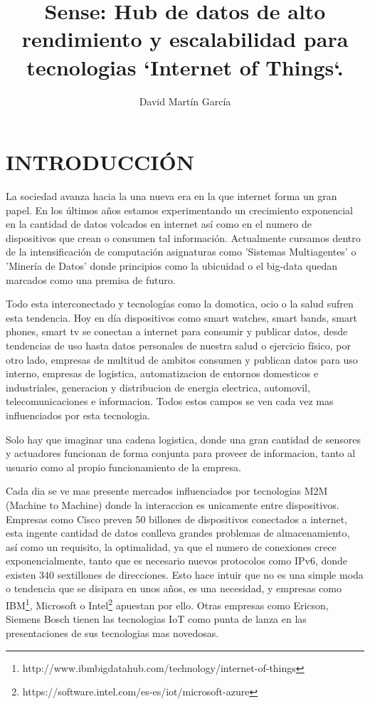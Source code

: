 \documentclass{pre-tfg}
\title{Sense: Hub de datos de alto rendimiento y escalabilidad para
  tecnologias `Internet of Things`.}
\author{David Martín García}
\begin{document}
\maketitle
\tableofcontents

\newpage

\section{INTRODUCCIÓN}

La sociedad avanza hacia la una nueva era en la que internet forma un
gran papel. En los últimos años estamos experimentando un crecimiento exponencial en la cantidad de datos volcados en internet así como en el numero de dispositivos que crean o consumen tal información. Actualmente cursamos dentro de la intensificación de computación asignaturas como 'Sistemas Multiagentes' o 'Minería de Datos' donde principios como la ubicuidad o el big-data quedan marcados como una premisa de futuro.

Todo esta interconectado y tecnologías como la domotica, ocio o la
salud sufren esta tendencia. Hoy en día dispositivos como smart
watches, smart bands, smart phones, smart tv se conectan a internet
para consumir y publicar datos, desde tendencias de uso hasta datos
personales de nuestra salud o ejercicio físico, por otro lado,
empresas de multitud de ambitos consumen y publican datos para uso
interno, empresas de logistica, automatizacion de entornos domesticos
e industriales, generacion y distribucion de energia electrica,
automovil, telecomunicaciones e informacion. Todos estos campos se ven
cada vez mas influenciados por esta tecnologia.

Solo hay que imaginar una cadena logistica, donde una gran cantidad de
sensores y actuadores funcionan de forma conjunta para proveer de
informacion, tanto al usuario como al propio funcionamiento de la
empresa.

Cada dia se ve mas presente mercados influenciados por tecnologias M2M
(Machine to Machine) donde la interaccion es unicamente entre
dispositivos. Empresas como Cisco preven 50 billones de dispositivos conectados a
internet, esta ingente cantidad de datos conlleva grandes problemas de almacenamiento, así como un
requisito, la optimalidad, ya que el numero de conexiones crece
exponencialmente, tanto que es necesario nuevos protocolos como IPv6,
donde existen 340 sextillones de direcciones. Esto hace intuir que no
es una simple moda o tendencia que se disipara en unos años, es una
necesidad, y empresas como
IBM\footnote{http://www.ibmbigdatahub.com/technology/internet-of-things},
Microsoft o
Intel\footnote{https://software.intel.com/es-es/iot/microsoft-azure}
apuestan por ello. Otras empresas como Ericson, Siemens Bosch tienen las tecnologias IoT
como punta de lanza en las presentaciones de sus tecnologias mas
novedosas.
\end{document}
